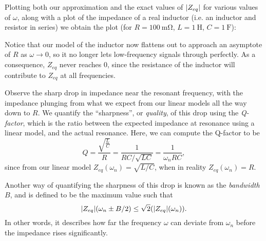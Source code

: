 \documentclass[letterpaper]{article}
\theoremstyle{remark}
\DeclarePairedDelimiter\abs{\lvert}{\rvert}%
\begin{document}
Plotting both our approximation and the exact values of $\abs{Z_{eq}}$ for various values of $\omega$, along with a plot of the impedance of a real inductor (i.e. an inductor and resistor in series) we obtain the plot (for $R = \SI{100}{\milli\ohm}$, $L = \SI{1}{\henry}$, $C=\SI{1}{\farad}$):
\begin{center}
\end{center}
Notice that our model of the inductor now flattens out to approach an asymptote of $R$ as $\omega \to 0$, so it no longer lets low-frequency signals through perfectly. As a consequence, $Z_{eq}$ never reaches $0$, since the resistance of the inductor will contribute to $Z_{eq}$ at all frequencies.

Observe the sharp drop in impedance near the resonant frequency, with the impedance plunging from what we expect from our linear models all the way down to $R$. We quantify the ``sharpness'', or \emph{quality}, of this drop using the \emph{Q-factor}, which is the ratio between the expected impedance at resonance using a linear model, and the actual resonance. Here, we can compute the Q-factor to be
\[
    Q = \frac{\sqrt{\frac{L}{C}}}{R} = \frac{1}{R C / \sqrt{LC}} = \frac{1}{\omega_nRC},
\]
since from our linear model $Z_{eq}(\omega_n) = \sqrt{L / C}$, when in reality $Z_{eq}(\omega_n) = R$.

Another way of quantifying the sharpness of this drop is known as the \emph{bandwidth} $B$, and is defined to be the maximum value such that
\[
    \abs{Z_{eq}}(\omega_n \pm B / 2) \le \sqrt{2} (\abs{Z_{eq}}(\omega_n)).
\]
In other words, it describes how far the frequency $\omega$ can deviate from $\omega_n$ before the impedance rises significantly. 
\end{document}

